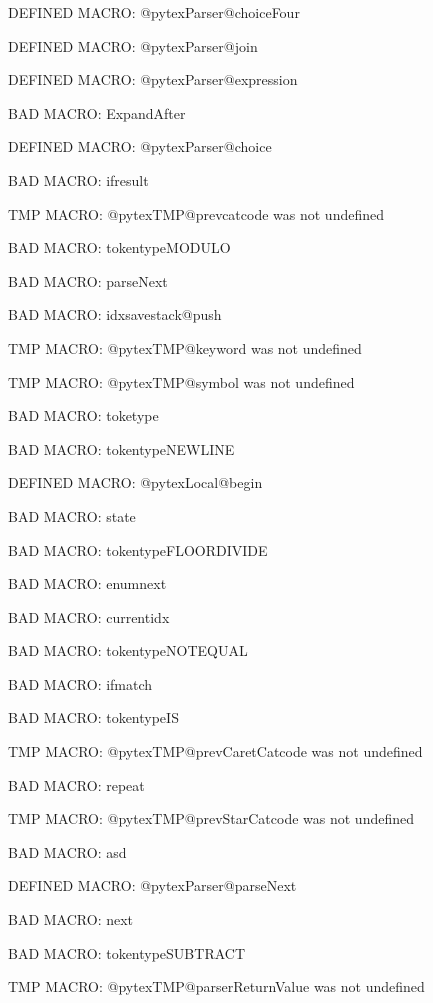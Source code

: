 \ifx\@pytexParser@choiceFour\undefined\else DEFINED MACRO: @pytexParser@choiceFour
\fi

\ifx\@pytexParser@join\undefined\else DEFINED MACRO: @pytexParser@join
\fi

\ifx\@pytexParser@expression\undefined\else DEFINED MACRO: @pytexParser@expression
\fi

BAD MACRO: ExpandAfter

\ifx\@pytexParser@choice\undefined\else DEFINED MACRO: @pytexParser@choice
\fi

BAD MACRO: ifresult

\ifx\@pytexTMP@prevcatcode\undefined\else TMP MACRO: @pytexTMP@prevcatcode was not undefined
\fi

BAD MACRO: tokentypeMODULO

BAD MACRO: parseNext

BAD MACRO: idxsavestack@push

\ifx\@pytexTMP@keyword\undefined\else TMP MACRO: @pytexTMP@keyword was not undefined
\fi

\ifx\@pytexTMP@symbol\undefined\else TMP MACRO: @pytexTMP@symbol was not undefined
\fi

BAD MACRO: toketype

BAD MACRO: tokentypeNEWLINE

\ifx\@pytexLocal@begin\undefined\else DEFINED MACRO: @pytexLocal@begin
\fi

BAD MACRO: state

BAD MACRO: tokentypeFLOORDIVIDE

BAD MACRO: enumnext

BAD MACRO: currentidx

BAD MACRO: tokentypeNOTEQUAL

BAD MACRO: ifmatch

BAD MACRO: tokentypeIS

\ifx\@pytexTMP@prevCaretCatcode\undefined\else TMP MACRO: @pytexTMP@prevCaretCatcode was not undefined
\fi

BAD MACRO: repeat

\ifx\@pytexTMP@prevStarCatcode\undefined\else TMP MACRO: @pytexTMP@prevStarCatcode was not undefined
\fi

BAD MACRO: asd

\ifx\@pytexParser@parseNext\undefined\else DEFINED MACRO: @pytexParser@parseNext
\fi

BAD MACRO: next

BAD MACRO: tokentypeSUBTRACT

\ifx\@pytexTMP@parserReturnValue\undefined\else TMP MACRO: @pytexTMP@parserReturnValue was not undefined
\fi

